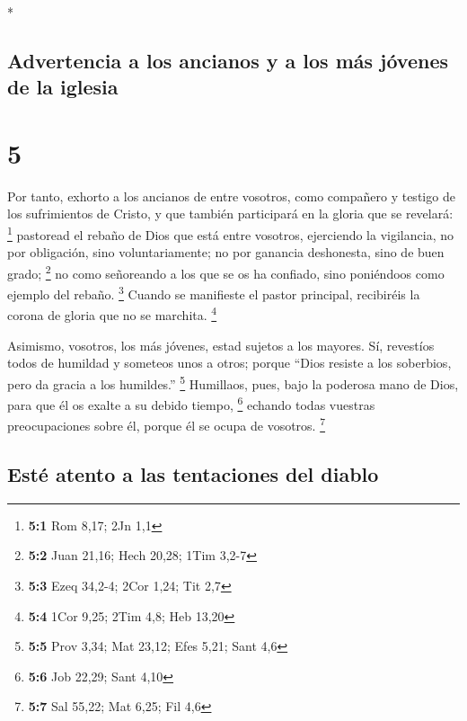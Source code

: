 \begin{paracol}{2}
\begin{otherlanguage}{english}
\end{otherlanguage}

\switchcolumn[0]*

\hypertarget{advertencia-a-los-ancianos-y-a-los-muxe1s-juxf3venes-de-la-iglesia}{%
\subsection{Advertencia a los ancianos y a los más jóvenes de la
iglesia}\label{advertencia-a-los-ancianos-y-a-los-muxe1s-juxf3venes-de-la-iglesia}}

\hypertarget{section-8}{%
\section{5}\label{section-8}}

 Por tanto, exhorto a los ancianos de entre vosotros, como
compañero y testigo de los sufrimientos de Cristo, y que también
participará en la gloria que se revelará: \footnote{\textbf{5:1} Rom
  8,17; 2Jn 1,1}  pastoread el rebaño de Dios que está
entre vosotros, ejerciendo la vigilancia, no por obligación, sino
voluntariamente; no por ganancia deshonesta, sino de buen grado;
\footnote{\textbf{5:2} Juan 21,16; Hech 20,28; 1Tim 3,2-7}
 no como señoreando a los que se os ha confiado, sino
poniéndoos como ejemplo del rebaño. \footnote{\textbf{5:3} Ezeq 34,2-4;
  2Cor 1,24; Tit 2,7}  Cuando se manifieste el pastor
principal, recibiréis la corona de gloria que no se marchita.
\footnote{\textbf{5:4} 1Cor 9,25; 2Tim 4,8; Heb 13,20}

 Asimismo, vosotros, los más jóvenes, estad sujetos a los
mayores. Sí, revestíos todos de humildad y someteos unos a otros; porque
``Dios resiste a los soberbios, pero da gracia a los humildes.''
\footnote{\textbf{5:5} Prov 3,34; Mat 23,12; Efes 5,21; Sant 4,6}
 Humillaos, pues, bajo la poderosa mano de Dios, para que
él os exalte a su debido tiempo, \footnote{\textbf{5:6} Job 22,29; Sant
  4,10}  echando todas vuestras preocupaciones sobre él,
porque él se ocupa de vosotros. \footnote{\textbf{5:7} Sal 55,22; Mat
  6,25; Fil 4,6}

\hypertarget{estuxe9-atento-a-las-tentaciones-del-diablo}{%
\subsection{Esté atento a las tentaciones del
diablo}\label{estuxe9-atento-a-las-tentaciones-del-diablo}}


\end{paracol}
